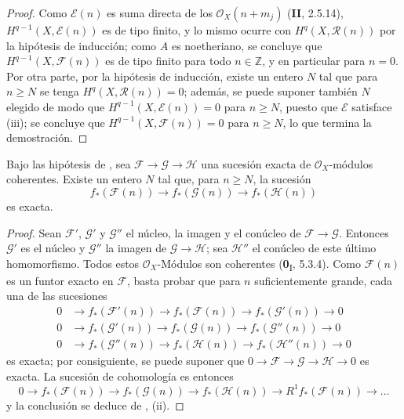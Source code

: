 \begin{proof}
Como $\mathcal E(n)$ es suma directa de los $\mathcal O_X(n+m_j)$ (\textbf{II}, 2.5.14), $H^{q-1}(X,\mathcal E(n))$ es de tipo finito, y lo mismo ocurre con $H^q(X,\mathcal R(n))$ por la hipótesis de inducción; como $A$ es noetheriano, se concluye que $H^{q-1}(X,\mathcal F(n))$ es de tipo finito para todo $n\in\mathbb Z$, y en particular para $n=0$. Por otra parte, por la hipótesis de inducción, existe un entero $N$ tal que para $n\geq N$ se tenga $H^q(X,\mathcal R(n))=0$; además, se puede suponer también $N$ elegido de modo que $H^{q-1}(X,\mathcal E(n))=0$ para $n\geq N$, puesto que $\mathcal E$ satisface (iii); se concluye que $H^{q-1}(X,\mathcal F(n))=0$ para $n\geq N$, lo que termina la demostración.
\end{proof}

\begin{corollary}[2.2.3]
\label{III.2.2.3}
\label{III.2.2.3-fr}
Bajo las hipótesis de \textup{}, sea
$\mathcal F\to\mathcal G\to\mathcal H$
una sucesión exacta de $\mathcal O_X$-módulos coherentes.
Existe un entero $N$ tal que, para $n\geq N$, la sucesión
\[
f_*(\mathcal F(n))\longrightarrow f_*(\mathcal G(n))
\longrightarrow f_*(\mathcal H(n))
\]
es exacta.
\end{corollary}

\begin{proof}
Sean $\mathcal F'$, $\mathcal G'$ y $\mathcal G''$ el núcleo, la imagen y el conúcleo de $\mathcal F\to\mathcal G$.
Entonces $\mathcal G'$ es el núcleo y $\mathcal G''$ la imagen de $\mathcal G\to\mathcal H$; sea $\mathcal H''$ el conúcleo de este último homomorfismo.
Todos estos $\mathcal O_X$-Módulos son
coherentes (\textbf{0}\textsubscript{I}, 5.3.4). Como $\mathcal F(n)$ es un
funtor exacto en $\mathcal F$, basta probar que para $n$ suficientemente grande, cada una de las sucesiones
\begin{align*}
0&\longrightarrow f_*(\mathcal F'(n))
\longrightarrow f_*(\mathcal F(n))
\longrightarrow f_*(\mathcal G'(n))\longrightarrow0\\
0&\longrightarrow f_*(\mathcal G'(n))
\longrightarrow f_*(\mathcal G(n))
\longrightarrow f_*(\mathcal G''(n))\longrightarrow0\\
0&\longrightarrow f_*(\mathcal G''(n))
\longrightarrow f_*(\mathcal H(n))
\longrightarrow f_*(\mathcal H''(n))\longrightarrow0
\end{align*} es exacta; por consiguiente, se puede suponer que $0\to\mathcal F\to\mathcal G\to\mathcal H\to0$
es exacta.
La sucesión de cohomología es entonces
\[
0\longrightarrow f_*(\mathcal F(n))
\longrightarrow f_*(\mathcal G(n))
\longrightarrow f_*(\mathcal H(n))
\longrightarrow R^1f_*(\mathcal F(n))\longrightarrow\ldots
\]
y la conclusión se deduce de , (ii).
\end{proof}

